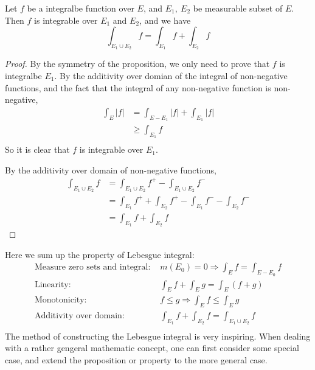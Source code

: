 \documentclass[lang=en, 12pt]{elegantbook}
\begin{document}
        \begin{theorem}
            Let $f$ be a integralbe function over $E$, and $E_1, \ E_2$ be measurable subset of $E$. Then $f$ is integrable over $E_1$ and 
        $E_2$, and we have 
        $$\int_{E_1 \cup E_2} f = \int_{E_1} f + \int_{E_2} f$$
        \end{theorem}
        \begin{proof}
            By the symmetry of the proposition, we only need to prove that $f$ is integralbe $E_1$. By the additivity over domian of the 
        integral of non-negative functions, and the fact that the integral of any non-negative function is non-negative,
        \begin{equation*}
            \begin{aligned}
                \int_E |f| &= \int_{E-E_1} |f| +\int_{E_1} |f| \\
                &\geq \int_{E_1} f \\
            \end{aligned}
        \end{equation*}
        So it is clear that $f$ is integrable over $E_1$. \par 
            By the additivity over domain of non-negative functions,
        \begin{equation*}
            \begin{aligned}
                \int_{E_1\cup E_2} f &= \int_{E_1\cup E_2} f^+ - \int_{E_1\cup E_2} f^-\\
                &= \int_{E_1} f^+ + \int_{E_2} f^+ - \int_{E_1} f^- - \int_{E_2} f^-\\
                &= \int_{E_1} f + \int_{E_2} f
            \end{aligned}
        \end{equation*}
        \end{proof}
            Here we sum up the property of Lebesgue integral:
            \begin{equation*}
                \begin{aligned}
                    \mbox{Measure zero sets and integral: }& m(E_0) = 0 \Rightarrow \int_E f = \int_{E-E_0} f\\
                    \mbox{Linearity: }& \int_E f + \int_E g = \int_E (f+g)\\
                    \mbox{Monotonicity: }& f \leq g \Rightarrow \int_E f \leq \int_E g\\
                    \mbox{Additivity over domain: }& \int_{E_1} f + \int_{E_2} f = \int_{E_1 \cup E_2} f\\ 
                \end{aligned}
            \end{equation*}
            The method of constructing the Lebesgue integral is very inspiring. When dealing with a rather gengeral mathematic concept,
        one can first consider some special case, and extend the proposition or property to the more general case.  
\end{document}
